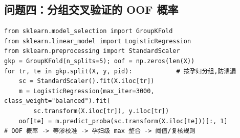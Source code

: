 \documentclass[11pt,a4paper]{ctexart}
\begin{document}
\subsection{问题四：分组交叉验证的 OOF 概率}
{\footnotesize\begin{verbatim}
from sklearn.model_selection import GroupKFold
from sklearn.linear_model import LogisticRegression
from sklearn.preprocessing import StandardScaler
gkp = GroupKFold(n_splits=5); oof = np.zeros(len(X))
for tr, te in gkp.split(X, y, pid):            # 按孕妇分组,防泄漏
    sc = StandardScaler().fit(X.iloc[tr])
    m = LogisticRegression(max_iter=3000, class_weight="balanced").fit(
        sc.transform(X.iloc[tr]), y.iloc[tr])
    oof[te] = m.predict_proba(sc.transform(X.iloc[te]))[:, 1]
# OOF 概率 -> 等渗校准 -> 孕妇级 max 整合 -> 阈值/复核规则
\end{verbatim}}
\end{document}
